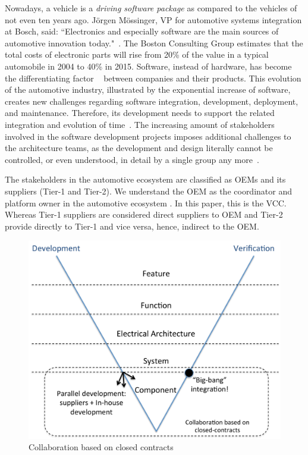 Nowadays, a vehicle is a {\em driving software package} as compared to the vehicles of not even ten years ago. J\"orgen M\"ossinger, VP for automotive systems integration at Bosch, said: ``Electronics and especially software are the main sources of automotive innovation today."~\cite{Mossinger2010SoftwareAutomotive}. The Boston Consulting Group estimates that the total costs of electronic parts will rise from 20\% of the value in a typical automobile in 2004 to 40\% in 2015. Software, instead of hardware, has become the differentiating factor%
~\cite{ConnectedVehicle2012,hbr2015hardwaresoftware,Mossinger2010SoftwareAutomotive,Broy:2006:CAS:1134285.1134292} %
between companies and their products. This evolution of the automotive industry, illustrated by the exponential increase of software, creates new challenges regarding software integration, development, deployment, and maintenance. Therefore, its development needs to support the related integration and evolution of time~\cite{Broy:2006:CAS:1134285.1134292,Patrizio2016AAF_Chalmers,qualman2009socialnomics,JansenTale2009}. The increasing amount of stakeholders involved in the software development projects imposes additional challenges to the architecture teams, as the development and design literally cannot be controlled, or even understood, in detail by a single group any more~\cite{Patrizio2016AAF_Chalmers}. 

The stakeholders in the automotive ecosystem are classified as OEMs and its suppliers (Tier-1 and Tier-2). We understand the OEM as the coordinator and platform owner in the automotive ecosystem \cite{KS15,Patrizio2016AAF_Chalmers}. In this paper, this is the VCC. Whereas Tier-1 suppliers are considered direct suppliers to OEM and Tier-2 provide directly to Tier-1 and vice versa, hence, indirect to the OEM. 

\begin{figure}[htb]
\centering
\includegraphics[width=\columnwidth]{figure/Closed-contract-collaboration.pdf}
\caption{Collaboration based on closed contracts}
\label{fig:closedContractCollaboration}
\end{figure}

